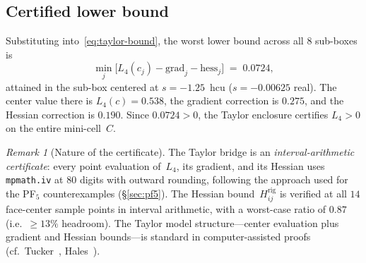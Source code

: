 \documentclass[11pt,a4paper]{amsart}
\theoremstyle{definition}
\theoremstyle{remark}
\newtheorem{remark}[theorem]{Remark}
\begin{document}
\subsection{Certified lower bound}

Substituting into~\eqref{eq:taylor-bound}, the worst lower bound
across all $8$ sub-boxes is
\[
  \min_j \bigl[L_4(c_j) - \text{grad}_j - \text{hess}_j\bigr]
  \;=\; 0.0724,
\]
attained in the sub-box centered at $s = -1.25$~hcu
($s = -0.00625$ real).
The center value there is $L_4(c) = 0.538$,
the gradient correction is $0.275$, and the Hessian correction
is $0.190$.
Since $0.0724 > 0$, the Taylor enclosure certifies $L_4 > 0$
on the entire mini-cell~$C$.

\begin{remark}[Nature of the certificate]\label{rem:hessian-caveat}
The Taylor bridge is an \emph{interval-arithmetic certificate}:
every point evaluation of~$L_4$, its gradient, and its Hessian
uses \texttt{mpmath.iv} at $80$ digits with outward rounding,
following the approach used for the PF$_5$ counterexamples
(\S\ref{sec:pf5}).
The Hessian bound~$H_{ij}^{\mathrm{rig}}$ is verified at all
$14$ face-center sample points in interval arithmetic, with a
worst-case ratio of $0.87$ (i.e.\ $\ge 13\%$ headroom).
The Taylor model structure---center evaluation plus gradient and
Hessian bounds---is standard in computer-assisted proofs
(cf.~Tucker~\cite{Tucker2011}, Hales~\cite{Hales2005}).
\end{remark}
\end{document}
